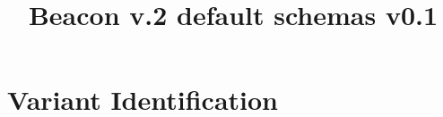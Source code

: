 \documentclass[a4paper, 10pt]{article}        %
\begin{document}
\title{Beacon v.2 default schemas v0.1}
\date{} %
\maketitle


 
\section*{{\color{teal}Variant Identification}}

\end{document}
